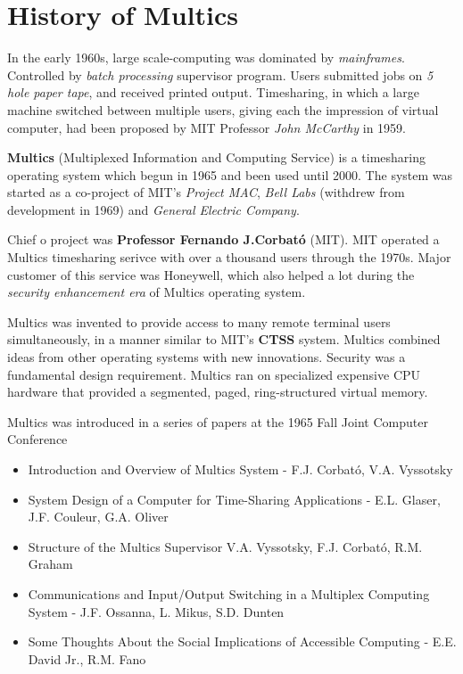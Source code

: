 


\section{History of Multics}

In the early 1960s, large scale-computing was dominated by \textit{mainframes}. Controlled by \textit{batch processing} 
supervisor program. Users submitted jobs on \textit{5 hole paper tape}, and received printed output.
Timesharing, in which a large machine switched between multiple users, giving each the impression of virtual computer, 
had been proposed by MIT Professor \textit{John McCarthy} in 1959.

\textbf{Multics} (Multiplexed Information and Computing Service) is a timesharing operating system which begun in 1965 and been 
used until 2000. The system was started as a co-project of MIT's \textit{Project MAC}, \textit{Bell Labs} (withdrew from development 
 in 1969) and \textit{General Electric Company}.

Chief o project was \textbf{Professor Fernando J.Corbató} (MIT). MIT operated a Multics timesharing serivce with over a thousand users 
through the 1970s. Major customer of this service was Honeywell, which also helped a lot during the \textit{security enhancement era} 
of Multics operating system.

Multics was invented to provide access to many remote terminal users simultaneously, in a manner similar to MIT's \textbf{CTSS} 
system. Multics combined ideas from other operating systems with new innovations. Security was a fundamental design requirement.
Multics ran on specialized expensive CPU hardware that provided a segmented, paged, ring-structured virtual memory. 

Multics was introduced in a series of papers at the 1965 Fall Joint Computer Conference
\begin{itemize}
    \item Introduction and Overview of Multics System - F.J. Corbató, V.A. Vyssotsky
    \item System Design of a Computer for Time-Sharing Applications - E.L. Glaser, J.F. Couleur, G.A. Oliver
    \item Structure of the Multics Supervisor V.A. Vyssotsky, F.J. Corbató, R.M. Graham
    \item Communications and Input/Output Switching in a Multiplex Computing System -  J.F. Ossanna, L. Mikus, S.D. Dunten
    \item Some Thoughts About the Social Implications of Accessible Computing - E.E. David Jr., R.M. Fano
\end{itemize}
